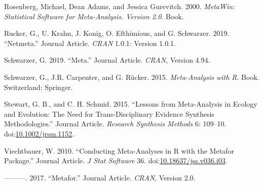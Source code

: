 \documentclass[fleqn,10pt]{wlpeerj} %
\begin{document}
\hypertarget{ref-RN6194}{}
Rosenberg, Michael, Dean Adams, and Jessica Gurevitch. 2000.
\emph{MetaWin: Statistical Software for Meta-Analysis. Version 2.0}.
Book.

\hypertarget{ref-RN6197}{}
Rucker, G., U. Krahn, J. Konig, O. Efthimious, and G. Schwarzer. 2019.
``Netmeta.'' Journal Article. \emph{CRAN} 1.0.1: Version 1.0.1.

\hypertarget{ref-RN6176}{}
Schwarzer, G. 2019. ``Meta.'' Journal Article. \emph{CRAN}, Version
4.94.

\hypertarget{ref-RN6199}{}
Schwarzer, G., J.R. Carpenter, and G. Rücker. 2015. \emph{Meta-Analysis
with R}. Book. Switzerland: Springer.

\hypertarget{ref-RN4861}{}
Stewart, G. B., and C. H. Schmid. 2015. ``Lessons from Meta-Analysis in
Ecology and Evolution: The Need for Trans-Disciplinary Evidence
Synthesis Methodologies.'' Journal Article. \emph{Research Synthesis
Methods} 6: 109--10.
doi:\href{https://doi.org/10.1002/jrsm.1152}{10.1002/jrsm.1152}.

\hypertarget{ref-RN4896}{}
Viechtbauer, W. 2010. ``Conducting Meta-Analyses in R with the Metafor
Package.'' Journal Article. \emph{J Stat Software} 36.
doi:\href{https://doi.org/10.18637/jss.v036.i03}{10.18637/jss.v036.i03}.

\hypertarget{ref-RN6175}{}
---------. 2017. ``Metafor.'' Journal Article. \emph{CRAN}, Version 2.0.
\end{document}
